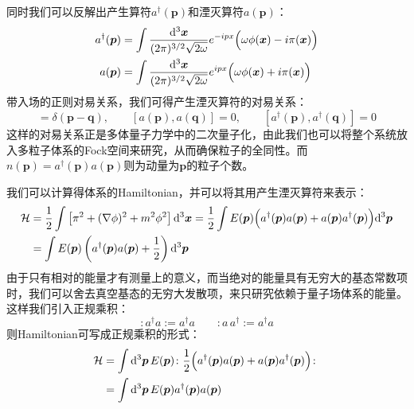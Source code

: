 同时我们可以反解出产生算符$a^{\dagger}(\boldsymbol{p})$和湮灭算符$a(\boldsymbol{p})$：
\begin{align}
a^{\dagger}(\boldsymbol{p})&=\int\frac{\mathrm{d}^3\boldsymbol{x}}{(2\pi)^{3/2}\sqrt{2\omega}}e^{-ipx}\Big(\omega\phi(\boldsymbol{x})-i\pi(\boldsymbol{x})\Big)\notag\\
a(\boldsymbol{p})&=\int\frac{\mathrm{d}^3\boldsymbol{x}}{(2\pi)^{3/2}\sqrt{2\omega}}e^{ipx}\Big(\omega\phi(\boldsymbol{x})+i\pi(\boldsymbol{x})\Big)
\end{align}
带入场的正则对易关系，我们可得产生湮灭算符的对易关系：
\begin{equation}
[a(\boldsymbol{p}),a^{\dagger}(\boldsymbol{q})]=\delta(\boldsymbol{p}-\boldsymbol{q}),\qquad
[a(\boldsymbol{p}),a(\boldsymbol{q})]=0,\qquad
[a^{\dagger}(\boldsymbol{p}),a^{\dagger}(\boldsymbol{q})]=0
\end{equation}
这样的对易关系正是多体量子力学中的二次量子化，由此我们也可以将整个系统放入多粒子体系的Fock空间来研究，从而确保粒子的全同性。而$n(\boldsymbol{p})=a^{\dagger}(\boldsymbol{p})a(\boldsymbol{p})$则为动量为$\boldsymbol{p}$的粒子个数。

我们可以计算得体系的Hamiltonian，并可以将其用产生湮灭算符来表示：
\begin{align}
\mathcal{H}&=\frac{1}{2}\int\left[\pi^2+(\nabla\phi)^2+m^2\phi^2\right]\mathrm{d}^3\boldsymbol{x}=\frac{1}{2}\int E(\boldsymbol{p})\Big(a^{\dagger}(\boldsymbol{p})a(\boldsymbol{p})+a(\boldsymbol{p})a^{\dagger}(\boldsymbol{p})\Big)\mathrm{d}^3\boldsymbol{p}\notag\\
&=\int E(\boldsymbol{p})\left(a^{\dagger}(\boldsymbol{p})a(\boldsymbol{p})+\frac{1}{2}\right)\mathrm{d}^3\boldsymbol{p}
\end{align}
由于只有相对的能量才有测量上的意义，而当绝对的能量具有无穷大的基态常数项时，我们可以舍去真空基态的无穷大发散项，来只研究依赖于量子场体系的能量。这样我们引入正规乘积：
\begin{equation}
:a^{\dagger}a:=a^{\dagger}a\qquad:a\,a^{\dagger}:=a^{\dagger}a
\end{equation}
则Hamiltonian可写成正规乘积的形式：
\begin{align}
\mathcal{H}&=\int\mathrm{d}^3\boldsymbol{p}\,E(\boldsymbol{p})\colon\frac{1}{2}\Big(a^{\dagger}(\boldsymbol{p})a(\boldsymbol{p})+a(\boldsymbol{p})a^{\dagger}(\boldsymbol{p})\Big)\colon\notag\\
&=\int\mathrm{d}^3\boldsymbol{p}\,E(\boldsymbol{p})a^{\dagger}(\boldsymbol{p})a(\boldsymbol{p})
\end{align}


